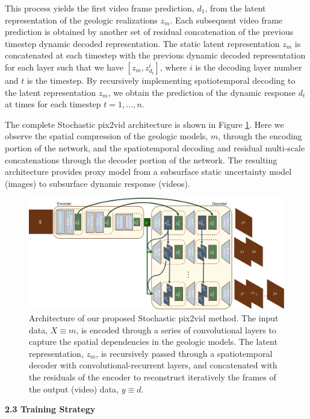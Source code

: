 \documentclass[10pt, twoside]{article}
\begin{document}
This process yields the first video frame prediction, $d_1$, from the latent representation of the geologic realizations $z_m$. Each subsequent video frame prediction is obtained by another set of residual concatenation of the previous timestep dynamic decoded representation. The static latent representation $z_m$ is concatenated at each timestep with the previous dynamic decoded representation for each layer such that we have $[z_m,z_{d_t}^i]$, where $i$ is the decoding layer number and $t$ is the timestep. By recursively implementing spatiotemporal decoding to the latent representation $z_m$, we obtain the prediction of the dynamic response $d_t$ at times for each timestep $t=1,\ldots,n$.

The complete Stochastic pix2vid architecture is shown in Figure \ref{cnnrnn_architecture}. Here we observe the spatial compression of the geologic models, $m$, through the encoding portion of the network, and the spatiotemporal decoding and residual multi-scale concatenations through the decoder portion of the network. The resulting architecture provides proxy model from a subsurface static uncertainty model (images) to subsurface dynamic response (videos).

\begin{figure}[t]
    \centering
    \includegraphics[width=\textwidth]{figures/architecture.png}
    \caption{Architecture of our proposed Stochastic pix2vid method. The input data, $X\equiv m$, is encoded through a series of convolutional layers to capture the spatial dependencies in the geologic models. The latent representation, $z_m$, is recursively passed through a spatiotemporal decoder with convolutional-recurrent layers, and concatenated with the residuals of the encoder to reconstruct iteratively the frames of the output (video) data, $y\equiv d$.}
    \label{cnnrnn_architecture}
\end{figure}


\textbf{2.3 Training Strategy} 
\end{document}
